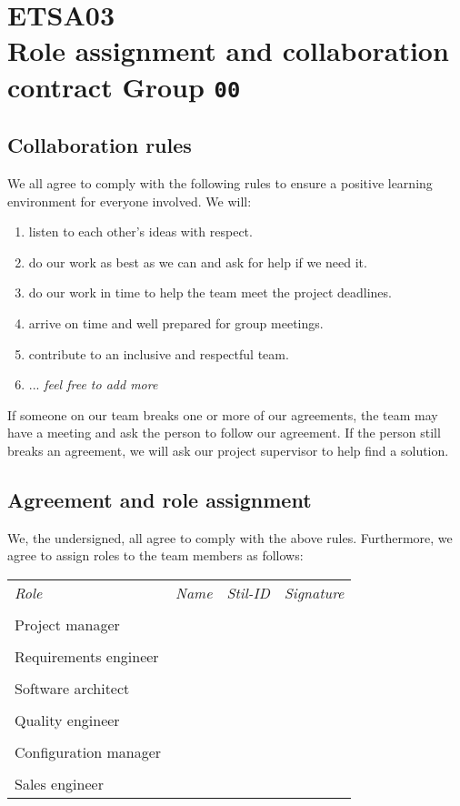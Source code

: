\documentclass[12pt]{article}
\begin{document}
\clearpage\thispagestyle{empty}

\section*{ETSA03\\Role assignment and collaboration contract Group \texttt{00}}
\subsection*{Collaboration rules}
We all agree to comply with the following rules to ensure a positive learning environment for everyone involved. We will:
\begin{enumerate}
\item listen to each other's ideas with respect.
\item do our work as best as we can and ask for help if we need it.
\item do our work in time to help the team meet the project deadlines.
\item arrive on time and well prepared for group meetings.
\item contribute to an inclusive and respectful team.
\item ... \emph{feel free to add more}
\end{enumerate}

If someone on our team breaks one or more of our agreements, the team may have a meeting and ask the person to follow our agreement. If the person still breaks an agreement, we will ask our project supervisor to help find a solution.

\subsection*{Agreement and role assignment}
We, the undersigned, all agree to comply with the above rules. Furthermore, we agree to assign roles to the team members as follows:

\vspace{1em}

\begin{tabular}{l p{4cm} l p{4cm}}
\emph{Role} & \emph{Name} & \emph{Stil-ID} & \emph{Signature} \\
\\ Project manager & \dotfill & \dotfill & \dotfill \\
\\ Requirements engineer & \dotfill & \dotfill & \dotfill \\
\\ Software architect & \dotfill & \dotfill & \dotfill \\
\\ Quality engineer & \dotfill & \dotfill & \dotfill \\
\\ Configuration manager & \dotfill & \dotfill & \dotfill \\
\\ Sales engineer & \dotfill & \dotfill & \dotfill \\
\end{tabular}
\end{document}
